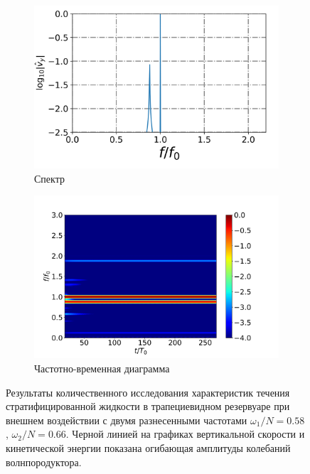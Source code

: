 \begin{figure}
\begin{subfigure}[с]{0.45\textwidth}
        \includegraphics[width=1\textwidth]{pics/H40L60N1ap02dp20w1p58w2p66Biharm/spectrumX36p4Y8p0.png}
        \caption{Спектр}
    \end{subfigure}
    \begin{subfigure}[с]{0.45\textwidth}
        \includegraphics[width=1\textwidth]{pics/H40L60N1ap02dp20w1p58w2p66Biharm/TFspectrumX36p4Y8p0N768.png}
        \caption{Частотно-временная диаграмма}
    \end{subfigure}
    \caption{Результаты количественного исследования характеристик течения стратифицированной жидкости в трапециевидном резервуаре при внешнем воздействии с двумя разнесенными частотами $\omega_1/N=0.58$,  $\omega_2/N=0.66$. Черной линией  на графиках вертикальной скорости и кинетической энергии показана огибающая амплитуды колебаний волнпородуктора.}
    \label{fig:biharmVyamp02}
\end{figure}

